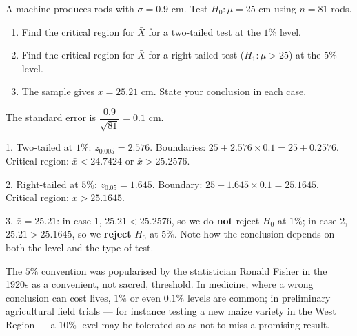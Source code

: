 \documentclass[11pt]{article}
\begin{document}
\begin{exercice}
A machine produces rods with $\sigma = 0.9$ cm. Test $H_0 : \mu = 25$ cm using $n = 81$ rods.
\begin{enumerate}
\item Find the critical region for $\bar{X}$ for a two-tailed test at the $1\%$ level.
\item Find the critical region for $\bar{X}$ for a right-tailed test ($H_1 : \mu > 25$) at the $5\%$ level.
\item The sample gives $\bar{x} = 25.21$ cm. State your conclusion in each case.
\end{enumerate}
\end{exercice}

\begin{corrige}[Exercise 1]
The standard error is $\dfrac{0.9}{\sqrt{81}} = 0.1$ cm.

1. Two-tailed at $1\%$: $z_{0.005} = 2.576$. Boundaries: $25 \pm 2.576 \times 0.1 = 25 \pm 0.2576$. Critical region: $\bar{x} < 24.7424$ or $\bar{x} > 25.2576$.

2. Right-tailed at $5\%$: $z_{0.05} = 1.645$. Boundary: $25 + 1.645 \times 0.1 = 25.1645$. Critical region: $\bar{x} > 25.1645$.

3. $\bar{x} = 25.21$: in case 1, $25.21 < 25.2576$, so we do \textbf{not} reject $H_0$ at $1\%$; in case 2, $25.21 > 25.1645$, so we \textbf{reject} $H_0$ at $5\%$. Note how the conclusion depends on both the level and the type of test.
\end{corrige}

\begin{savaistu}[Why 5\%?]
The $5\%$ convention was popularised by the statistician Ronald Fisher in the 1920s as a convenient, not sacred, threshold. In medicine, where a wrong conclusion can cost lives, $1\%$ or even $0.1\%$ levels are common; in preliminary agricultural field trials — for instance testing a new maize variety in the West Region — a $10\%$ level may be tolerated so as not to miss a promising result.
\end{savaistu}
\end{document}
